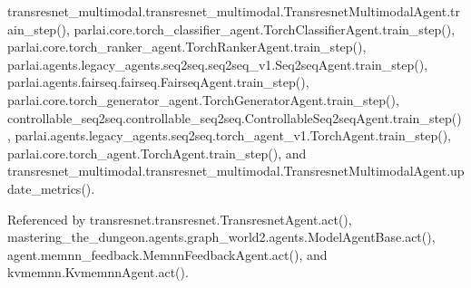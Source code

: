 transresnet\+\_\+multimodal.\+transresnet\+\_\+multimodal.\+Transresnet\+Multimodal\+Agent.\+train\+\_\+step(), parlai.\+core.\+torch\+\_\+classifier\+\_\+agent.\+Torch\+Classifier\+Agent.\+train\+\_\+step(), parlai.\+core.\+torch\+\_\+ranker\+\_\+agent.\+Torch\+Ranker\+Agent.\+train\+\_\+step(), parlai.\+agents.\+legacy\+\_\+agents.\+seq2seq.\+seq2seq\+\_\+v1.\+Seq2seq\+Agent.\+train\+\_\+step(), parlai.\+agents.\+fairseq.\+fairseq.\+Fairseq\+Agent.\+train\+\_\+step(), parlai.\+core.\+torch\+\_\+generator\+\_\+agent.\+Torch\+Generator\+Agent.\+train\+\_\+step(), controllable\+\_\+seq2seq.\+controllable\+\_\+seq2seq.\+Controllable\+Seq2seq\+Agent.\+train\+\_\+step(), parlai.\+agents.\+legacy\+\_\+agents.\+seq2seq.\+torch\+\_\+agent\+\_\+v1.\+Torch\+Agent.\+train\+\_\+step(), parlai.\+core.\+torch\+\_\+agent.\+Torch\+Agent.\+train\+\_\+step(), and transresnet\+\_\+multimodal.\+transresnet\+\_\+multimodal.\+Transresnet\+Multimodal\+Agent.\+update\+\_\+metrics().



Referenced by transresnet.\+transresnet.\+Transresnet\+Agent.\+act(), mastering\+\_\+the\+\_\+dungeon.\+agents.\+graph\+\_\+world2.\+agents.\+Model\+Agent\+Base.\+act(), agent.\+memnn\+\_\+feedback.\+Memnn\+Feedback\+Agent.\+act(), and kvmemnn.\+Kvmemnn\+Agent.\+act().


